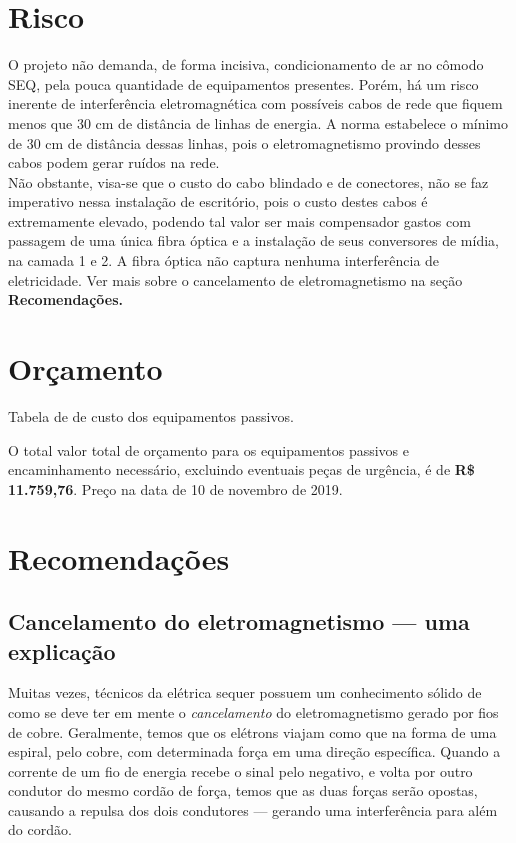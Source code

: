 \documentclass[	DIV=calc,%
							paper=a4,%
							fontsize=12pt,%
							onecolumn]{scrartcl}	 					%
\begin{document}
\section{Risco}

O projeto não demanda, de forma incisiva, condicionamento de ar no cômodo SEQ, pela pouca quantidade de equipamentos presentes. Porém, há um risco inerente de interferência eletromagnética com possíveis cabos de rede que fiquem menos que 30 cm de distância de linhas de energia. A norma estabelece o mínimo de 30 cm de distância dessas linhas, pois o eletromagnetismo provindo desses cabos podem gerar ruídos na rede.
\\

Não obstante, visa-se que o custo do cabo blindado e de conectores, não se faz imperativo nessa instalação de escritório, pois o custo destes cabos é extremamente elevado, podendo tal valor ser mais compensador gastos com passagem de uma única fibra óptica e a instalação de seus conversores de mídia, na camada 1 e 2. A fibra óptica não captura nenhuma interferência de eletricidade. Ver mais sobre o cancelamento de eletromagnetismo na seção \textbf{Recomendações.}



\section{Orçamento}
Tabela de de custo dos equipamentos passivos.






O total valor total de orçamento para os equipamentos passivos e encaminhamento necessário, excluindo eventuais peças de urgência, é de \textbf{R\$ 11.759,76}.
Preço na data de 10 de novembro de 2019.

\pagebreak

\section{Recomendações}

\subsection{Cancelamento do eletromagnetismo --- uma explicação}

Muitas vezes, técnicos da elétrica sequer possuem um conhecimento sólido de como se deve ter em mente o \textit{cancelamento} do eletromagnetismo gerado por fios de cobre. Geralmente, temos que os elétrons viajam como que na forma de uma espiral, pelo cobre, com determinada força em uma direção específica. Quando a corrente de um fio de energia recebe o sinal pelo negativo, e volta por outro condutor do mesmo cordão de força, temos que as duas forças serão opostas, causando a repulsa dos dois condutores --- gerando uma interferência para além do cordão. 
\\
\end{document}
